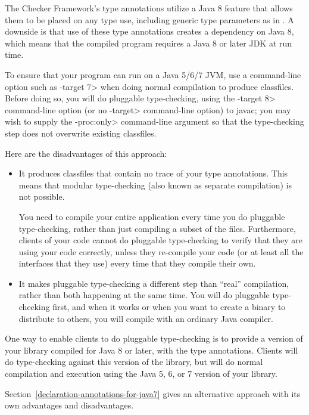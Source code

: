 The Checker Framework's type annotations utilize a Java 8 feature that
allows them to be placed on any type use, including generic type parameters
as in .  A downside is that use of these type
annotations creates a dependency on Java 8, which means that the compiled
program requires a Java 8 or later JDK at run time.

To ensure that your program can run on a Java 5/6/7 JVM, use a command-line
option such as \<-target 7> when doing normal compilation to produce
classfiles.  Before doing so, you will do pluggable type-checking, using the
\<-target 8> command-line option (or no \<-target> command-line option) to
javac; you may wish to supply the \<-proc:only> command-line argument so
that the type-checking step does not overwrite existing classfiles.

Here are the disadvantages of this approach:

\begin{itemize}
\item
It produces classfiles that contain no trace of your type annotations.
This means that modular type-checking (also known as separate compilation)
is not possible.

You need to compile your entire application every time you
do pluggable type-checking, rather than just compiling a subset of the
files.  Furthermore, clients of your code cannot do pluggable
type-checking to verify that they are using your code correctly, unless
they re-compile your code (or at least all the interfaces that they use)
every time that they compile their own.

\item
It makes pluggable type-checking a
different step than ``real'' compilation, rather than both happening at the
same time.  You will do pluggable type-checking first, and when it works or
when you want to create a binary to distribute to others, you will compile
with an ordinary Java compiler.
\end{itemize}

One way to enable clients to do pluggable type-checking is to provide a
version of your library compiled for Java 8 or later, with the type
annotations.  Clients will do type-checking against this version of the
library, but will do normal compilation and execution using the Java 5, 6,
or 7 version of your library.

Section~\ref{declaration-annotations-for-java7} gives an alternative
approach with its own advantages and disadvantages.


